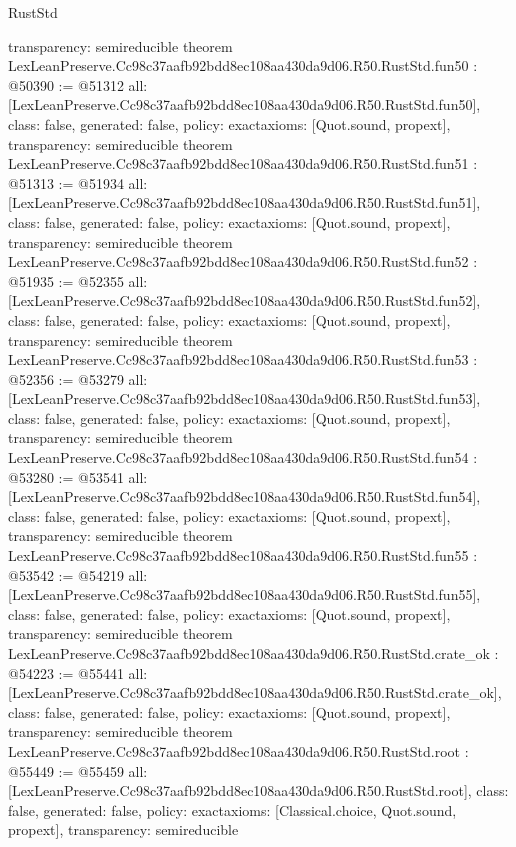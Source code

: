 \begin{lexlean}{RustStd}
\begin{coremodule}
{  transparency: semireducible
}
theorem LexLeanPreserve.Cc98c37aafb92bdd8ec108aa430da9d06.R50.RustStd.fun50 : @50390 := @51312 {
  all: [LexLeanPreserve.Cc98c37aafb92bdd8ec108aa430da9d06.R50.RustStd.fun50],
  class: false,
  generated: false,
  policy: exact{axioms: [Quot.sound, propext]},
  transparency: semireducible
}
theorem LexLeanPreserve.Cc98c37aafb92bdd8ec108aa430da9d06.R50.RustStd.fun51 : @51313 := @51934 {
  all: [LexLeanPreserve.Cc98c37aafb92bdd8ec108aa430da9d06.R50.RustStd.fun51],
  class: false,
  generated: false,
  policy: exact{axioms: [Quot.sound, propext]},
  transparency: semireducible
}
theorem LexLeanPreserve.Cc98c37aafb92bdd8ec108aa430da9d06.R50.RustStd.fun52 : @51935 := @52355 {
  all: [LexLeanPreserve.Cc98c37aafb92bdd8ec108aa430da9d06.R50.RustStd.fun52],
  class: false,
  generated: false,
  policy: exact{axioms: [Quot.sound, propext]},
  transparency: semireducible
}
theorem LexLeanPreserve.Cc98c37aafb92bdd8ec108aa430da9d06.R50.RustStd.fun53 : @52356 := @53279 {
  all: [LexLeanPreserve.Cc98c37aafb92bdd8ec108aa430da9d06.R50.RustStd.fun53],
  class: false,
  generated: false,
  policy: exact{axioms: [Quot.sound, propext]},
  transparency: semireducible
}
theorem LexLeanPreserve.Cc98c37aafb92bdd8ec108aa430da9d06.R50.RustStd.fun54 : @53280 := @53541 {
  all: [LexLeanPreserve.Cc98c37aafb92bdd8ec108aa430da9d06.R50.RustStd.fun54],
  class: false,
  generated: false,
  policy: exact{axioms: [Quot.sound, propext]},
  transparency: semireducible
}
theorem LexLeanPreserve.Cc98c37aafb92bdd8ec108aa430da9d06.R50.RustStd.fun55 : @53542 := @54219 {
  all: [LexLeanPreserve.Cc98c37aafb92bdd8ec108aa430da9d06.R50.RustStd.fun55],
  class: false,
  generated: false,
  policy: exact{axioms: [Quot.sound, propext]},
  transparency: semireducible
}
theorem LexLeanPreserve.Cc98c37aafb92bdd8ec108aa430da9d06.R50.RustStd.crate_ok : @54223 := @55441 {
  all: [LexLeanPreserve.Cc98c37aafb92bdd8ec108aa430da9d06.R50.RustStd.crate_ok],
  class: false,
  generated: false,
  policy: exact{axioms: [Quot.sound, propext]},
  transparency: semireducible
}
theorem LexLeanPreserve.Cc98c37aafb92bdd8ec108aa430da9d06.R50.RustStd.root : @55449 := @55459 {
  all: [LexLeanPreserve.Cc98c37aafb92bdd8ec108aa430da9d06.R50.RustStd.root],
  class: false,
  generated: false,
  policy: exact{axioms: [Classical.choice, Quot.sound, propext]},
  transparency: semireducible
}


\end{coremodule}
\end{lexlean}
